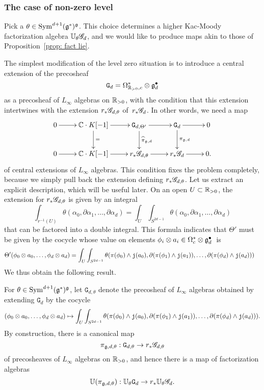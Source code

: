 \subsubsection{The case of non-zero level}

Pick a $\theta \in {\rm Sym}^{d+1}(\mathfrak g^*)^\mathfrak g$. 
This choice determines a higher Kac-Moody factorization algebra $\mathbb U_\theta \mathscr G_d$,
and we would like to produce maps akin to those of Proposition~\ref{prop: fact lie}.

The simplest modification of the level zero situation is to introduce a central extension of the precosheaf
\[
\mathtt{G}_d = \Omega^*_{\mathbb R_{>0},c} \otimes \mathfrak g^\bullet_d
\] 
as a precosheaf of $L_\infty$ algebras on $\mathbb R_{>0}$,
with the condition that this extension intertwines with the extension $r_*\mathscr G_{d,\theta}$ of~$r_* \mathscr G_{d}$.
In other words, we need a map 
\[
\xymatrix{
0 \ar[r] & \CC \cdot K [-1]  \ar[d]^{=} \ar[r] & \mathtt{G}_{d,\Theta'} \ar[d]^{{\Hat{\pi}}_{\fg,d}} \ar[r] & \mathtt{G}_d \ar[d]^{\pi_{\fg, d}} \ar[r] & 0 \\
0 \ar[r] & \CC \cdot K [-1] \ar[r] & r_*\sG_{d,\theta} \ar[r] & r_* \sG_{d} \ar[r] & 0 .
}
\]
of central extensions of $L_\infty$ algebras.
This condition fixes the problem completely, 
because we simply pull back the extension defining $r_*\mathscr G_{d,\theta}$.
Let us extract an explicit description,
which will be useful later.
On an open $U \subset \mathbb R_{>0}$, the extension for $r_*\mathscr G_{d,\theta}$ is given by an integral
\[
\int_{r^{-1}(U)} \theta(\alpha_0,\partial \alpha_1,\ldots,\partial \alpha_d) = \int_U \int_{S^{2d-1}} \theta(\alpha_0,\partial \alpha_1,\ldots,\partial \alpha_d)
\]
that can be factored into a double integral. 
This formula indicates that $\Theta'$ must be given by the cocycle whose value on elements $\phi_i \otimes a_i \in \Omega^*_c \otimes \mathfrak g^\bullet_d$~is
\begin{align*}
\Theta'(\phi_0 \otimes a_0, \ldots, \phi_d \otimes a_d)
&= \int_U \int_{S^{2d-1}} \theta(\pi(\phi_0) \wedge {\mathtt{j}}(a_0),\partial (\pi(\phi_1) \wedge {\mathtt{j}}(a_1)),\ldots,\partial(\pi(\phi_d) \wedge {\mathtt{j}}(a_d))) 
\end{align*}
We thus obtain the following result.

\begin{lem} 
For $\theta \in {\rm Sym}^{d+1}(\mathfrak g^*)^\mathfrak g$,
let $\mathtt{G}_{d,\theta}$ denote the precosheaf of $L_\infty$ algebras obtained by extending $\mathtt{G}_d$ by the cocycle
\[
(\phi_0 \otimes a_0, \ldots, \phi_d \otimes a_d) \mapsto \int_U \int_{S^{2d-1}} \theta(\pi(\phi_0) \wedge {\mathtt{j}}(a_0),\partial (\pi(\phi_1) \wedge {\mathtt{j}}(a_1)),\ldots,\partial(\pi(\phi_d) \wedge {\mathtt{j}}(a_d))).
\]
By construction, there is a canonical map 
\[
\pi_{\mathfrak g,d,\theta}: \mathtt{G}_{d,\theta} \to r_* \mathscr G_{d,\theta}
\]
of precosheaves of $L_\infty$ algebras on $\mathbb R_{>0}$, 
and hence there is a map of factorization algebras
\[
\mathbb U(\pi_{\mathfrak g,d,\theta}): \mathbb U_{\theta} \mathtt{G}_d \to r_* \mathbb U_\theta \mathscr G_d.
\]
\end{lem}

